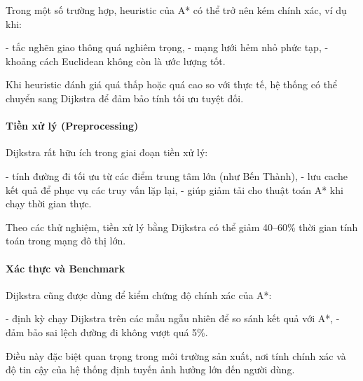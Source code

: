 Trong một số trường hợp, heuristic của A* có thể trở nên kém chính xác, ví dụ khi:

- tắc nghẽn giao thông quá nghiêm trọng,
- mạng lưới hẻm nhỏ phức tạp,
- khoảng cách Euclidean không còn là ước lượng tốt.

Khi heuristic đánh giá quá thấp hoặc quá cao so với thực tế, hệ thống có thể chuyển sang Dijkstra để đảm bảo tính tối ưu tuyệt đối.

\paragraph{Tiền xử lý (Preprocessing)}

Dijkstra rất hữu ích trong giai đoạn tiền xử lý:

- tính đường đi tối ưu từ các điểm trung tâm lớn (như Bến Thành),
- lưu cache kết quả để phục vụ các truy vấn lặp lại,
- giúp giảm tải cho thuật toán A* khi chạy thời gian thực.

Theo các thử nghiệm, tiền xử lý bằng Dijkstra có thể giảm 40--60\% thời gian tính toán trong mạng đô thị lớn.

\paragraph{Xác thực và Benchmark}

Dijkstra cũng được dùng để kiểm chứng độ chính xác của A*:

- định kỳ chạy Dijkstra trên các mẫu ngẫu nhiên để so sánh kết quả với A*,
- đảm bảo sai lệch đường đi không vượt quá 5\%.

Điều này đặc biệt quan trọng trong môi trường sản xuất, nơi tính chính xác và độ tin cậy của hệ thống định tuyến ảnh hưởng lớn đến người dùng.